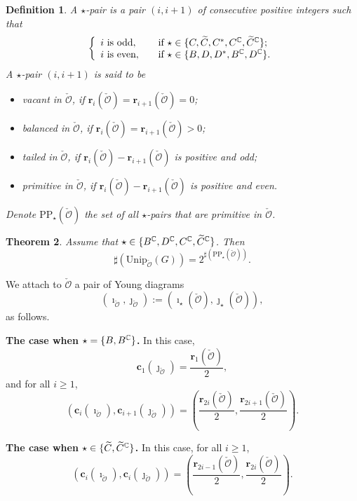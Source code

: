 \documentclass[12pt,a4paper]{amsart}
\newcommand{\CO}{{\mathcal {O}}}
\numberwithin{equation}{section}
\newtheorem{thm}{Theorem}[section]
\newtheorem{defn}[thm]{Definition}
\theoremstyle{remark}
\def\Unip{\mathrm{Unip}}
\begin{document}
\begin{defn}
 A $\star$-pair is a pair  $(i,i+1)$ of consecutive positive integers such that
\[
   \left\{
     \begin{array}{ll}
      i\textrm{ is odd}, \quad &\textrm{if $\star\in\{C, \widetilde{C}, C^*, C^{\mathbb{C}}, \widetilde C^{\mathbb{C}}\}$};  \\
      i \textrm{ is even}, \quad &\textrm{if $\star\in\{B, D, D^*, B^{\mathbb{C}}, D^{\mathbb{C}}\}$}. \\
       \end{array}
   \right.
\]
A $\star$-pair   $(i,i+1)$ is said to be
\begin{itemize}
\item
vacant in $\check \CO$, if $\mathbf r_i(\check \CO)=\mathbf r_{i+1}(\check \CO)=0$;
\item
balanced in $\check \CO$,  if  $\mathbf r_i(\check \CO)=\mathbf r_{i+1}(\check \CO)>0$;
\item
tailed in $\check \CO$,  if  $\mathbf r_i(\check \CO)-\mathbf r_{i+1}(\check \CO)$ is positive and odd;
\item
primitive in $\check \CO$, if    $\mathbf r_i(\check \CO)-\mathbf r_{i+1}(\check \CO)$ is positive and even.
\end{itemize}
Denote $\mathrm{PP}_\star(\check \CO)$ the  set of all $\star$-pairs that are primitive in $\check \CO$.
\end{defn}



\begin{thm}\label{complex}
Assume that $\star\in \{B^{\mathbb{C}},D^{\mathbb{C}}, C^{\mathbb{C}}, \widetilde C^{\mathbb{C}}\}$. Then
 \[
\sharp(\Unip_{\check \CO}(G))=2^{\sharp(\mathrm{PP}_\star(\check \CO))} .        \]
\end{thm}



We attach to $\check \CO$ a pair of Young diagrams
\[
(\imath_{\check \CO}, \jmath_{\check \CO}):=(\imath_\star(\check \CO), \jmath_\star(\check \CO)),
\]
 as follows.

\medskip

\noindent
{\bf The case when $\star=\{B, B^{\mathbb{C}}\}$.} In this case,
 \[
   \mathbf c_{1}(\jmath_{\check \CO})=\frac{\mathbf r_1(\check \CO)}{2},
\]
and for all $i\geq 1$,
\[
\left (\mathbf c_{i}(\imath_{\check \CO}), \mathbf c_{i+1}(\jmath_{\check \CO})\right )=
            \left (\frac{\mathbf r_{2i}(\check \CO)}{2},  \frac{\mathbf r_{2i+1}(\check \CO)}{2}\right ).
\]

\medskip

\noindent
{\bf The case when $\star\in \{\widetilde C, \widetilde C^{\mathbb{C}}\}$.}  In this case, for all $i\geq 1$,
\[
(\mathbf c_{i}(\imath_{\check \CO}), \mathbf c_{i}(\jmath_{\check \CO}))=
           \left (\frac{\mathbf r_{2i-1}(\check \CO)}{2},  \frac{\mathbf r_{2i}(\check \CO)}{2}\right).
\]
\end{document}
